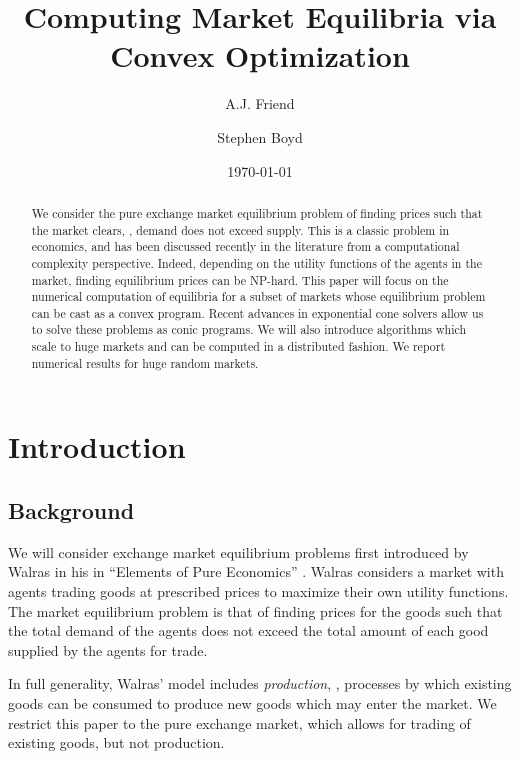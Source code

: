 \documentclass[12pt]{article}
\title{Computing Market Equilibria via Convex Optimization}
\author{A.J. Friend \and Stephen Boyd}
\date{\today}
\begin{document}
\maketitle

\begin{abstract}

We consider the pure exchange market equilibrium problem of finding prices such
that the market clears, \ie, demand does not exceed supply. This is a classic
problem in economics, and has been discussed recently in the literature from a
computational complexity perspective. Indeed, depending on the utility
functions of the agents in the market, finding equilibrium prices can be
NP-hard. This paper will focus on the numerical computation of equilibria for a
subset of markets whose equilibrium problem can be cast as a convex program.
Recent advances in exponential cone solvers allow us to solve these problems as
conic programs. We will also introduce algorithms which scale to huge markets
and can be computed in a distributed fashion. We report numerical results for
huge random markets.

\end{abstract}

\newpage
\tableofcontents
\newpage


\section{Introduction}
\subsection{Background}

We will consider exchange market equilibrium problems first introduced by
Walras in his in ``Elements of Pure Economics'' \cite{walras1896elements}.
Walras considers a market with agents trading goods at prescribed prices to
maximize their own utility functions. The market equilibrium problem is that of
finding prices for the goods such that the total demand of the agents does not
exceed the total amount of each good supplied by the agents for trade.

In full generality, Walras' model includes \emph{production}, \ie, processes by
which existing goods can be consumed to produce new goods which may enter the
market. We restrict this paper to the pure exchange market, which allows for
trading of existing goods, but not production.
\end{document}
